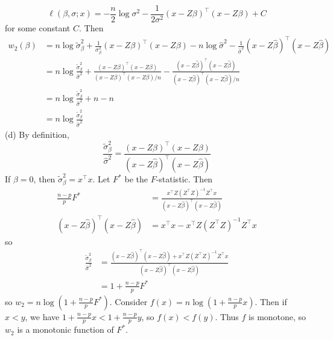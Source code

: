 \documentclass[12pt]{article}
\begin{document}
\begin{enumerate}
{\begin{equation*}
    \ell(\beta, \sigma ; x) = -\frac n2 \log \sigma^2 - \frac{1}{2\sigma^2} (x - Z\beta)^\top (x - Z\beta)  + C
\end{equation*}
for some constant $C$. Then 
\begin{align*}
    w_2(\beta) &= n\log \tilde \sigma_\beta^2 + \frac{1}{\sigma_\beta^2}(x - Z\beta)^\top (x - Z\beta) - n \log \hat\sigma^2 - \frac{1}{\hat\sigma^2}(x - Z\hat\beta)^\top (x - Z\hat\beta)\\
    &= n \log \frac{\tilde \sigma_\beta^2}{\hat\sigma^2} + \frac{(x - Z\beta)^\top (x - Z\beta)}{(x - Z\beta)^\top (x - Z\beta)/n} - \frac{(x - Z\hat\beta)^\top (x - Z\hat\beta)}{(x - Z\hat\beta)^\top (x - Z\hat\beta)/n}\\
    &= n\log \frac{\tilde \sigma_\beta^2}{\hat\sigma^2} + n - n \\
    &= n \log \frac{\tilde \sigma_\beta^2}{\hat\sigma^2}
\end{align*}
(d) By definition, 
\begin{equation*}
    \frac{\tilde \sigma_\beta^2}{\hat\sigma^2} = \frac{(x - Z\beta)^\top (x - Z\beta)}{(x - Z\hat\beta)^\top (x - Z\hat\beta)}
\end{equation*}
If $\beta = 0$, then $\tilde \sigma_\beta^2 = x^\top x$. Let $F^*$ be the $F$-statistic. Then 
\begin{align*}
    \frac{n-p}{p}F^* &= \frac{x^\top Z(Z^\top Z)^{-1} Z^\top x}{(x - Z\hat\beta)^\top (x - Z\hat\beta)}\\
    (x - Z\hat\beta)^\top (x - Z\hat\beta) &= x^\top x - x^\top Z(Z^\top Z)^{-1} Z^\top x
\end{align*}
so 
\begin{align*}
    \frac{\tilde \sigma_\beta^2}{\hat\sigma^2} &= \frac{(x - Z\hat\beta)^\top (x - Z\hat\beta) + x^\top Z (Z^\top Z)^{-1} Z^\top x}{(x - Z\hat\beta)^\top (x - Z\hat\beta)}\\
    &= 1 + \frac{n-p}{p}F^*
\end{align*}
so $w_2 = n \log \left(1 + \frac{n-p}{p}F^*\right)$. Consider $f(x) = n\log (1 + \frac{n-p}{p}x)$. Then if $x < y$, we have $1 + \frac{n-p}{p}x < 1 + \frac{n-p}{p}y$, so $f(x) < f(y)$. Thus $f$ is monotone, so $w_2$ is a monotonic function of $F^*$. 
}
\end{enumerate}
\end{document}
